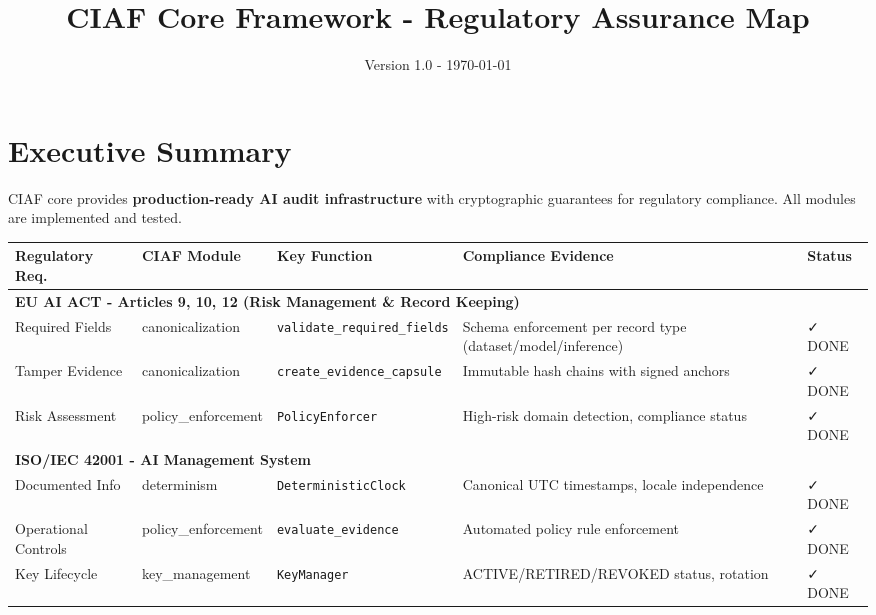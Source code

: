 \documentclass[11pt,a4paper]{article}
\title{\textbf{CIAF Core Framework - Regulatory Assurance Map}}
\author{Version 1.0 - \today}
\date{}
\begin{document}
\maketitle
\vspace{-1cm}

\section*{Executive Summary}
CIAF core provides \textbf{production-ready AI audit infrastructure} with cryptographic guarantees for regulatory compliance. All modules are implemented and tested.

\begin{longtable}{|p{2.5cm}|p{2cm}|p{1.8cm}|p{6cm}|p{1.5cm}|}
\hline
\rowcolor{gray!30}
\textbf{Regulatory Req.} & \textbf{CIAF Module} & \textbf{Key Function} & \textbf{Compliance Evidence} & \textbf{Status} \\
\hline
\endhead

\multicolumn{5}{|l|}{\cellcolor{blue!20}\textbf{EU AI ACT - Articles 9, 10, 12 (Risk Management \& Record Keeping)}} \\
\hline

Required Fields & canonicalization & \texttt{validate\_required\_fields} & Schema enforcement per record type (dataset/model/inference) & \cellcolor{green!30}✓ DONE \\
\hline

Tamper Evidence & canonicalization & \texttt{create\_evidence\_capsule} & Immutable hash chains with signed anchors & \cellcolor{green!30}✓ DONE \\
\hline

Risk Assessment & policy\_enforcement & \texttt{PolicyEnforcer} & High-risk domain detection, compliance status & \cellcolor{green!30}✓ DONE \\
\hline

\multicolumn{5}{|l|}{\cellcolor{blue!20}\textbf{ISO/IEC 42001 - AI Management System}} \\
\hline

Documented Info & determinism & \texttt{DeterministicClock} & Canonical UTC timestamps, locale independence & \cellcolor{green!30}✓ DONE \\
\hline

Operational Controls & policy\_enforcement & \texttt{evaluate\_evidence} & Automated policy rule enforcement & \cellcolor{green!30}✓ DONE \\
\hline

Key Lifecycle & key\_management & \texttt{KeyManager} & ACTIVE/RETIRED/REVOKED status, rotation & \cellcolor{green!30}✓ DONE \\
\hline


\end{longtable}
\end{document}

